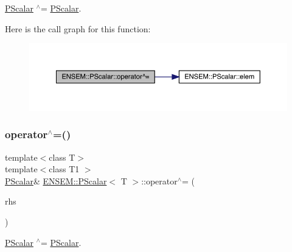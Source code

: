 \mbox{\hyperlink{classENSEM_1_1PScalar}{P\+Scalar}} $^\wedge$= \mbox{\hyperlink{classENSEM_1_1PScalar}{P\+Scalar}}. 

Here is the call graph for this function\+:
\nopagebreak
\begin{figure}[H]
\begin{center}
\leavevmode
\includegraphics[width=350pt]{d3/d27/classENSEM_1_1PScalar_a3f256371cc925f01209559addfcbb632_cgraph}
\end{center}
\end{figure}
\mbox{\label{classENSEM_1_1PScalar_a3f256371cc925f01209559addfcbb632}} 
\subsubsection{\texorpdfstring{operator$^\wedge$=()}{operator^=()}\hspace{0.1cm}{\footnotesize\ttfamily [2/2]}}
{\footnotesize\ttfamily template$<$class T$>$ \\
template$<$class T1 $>$ \\
\mbox{\hyperlink{classENSEM_1_1PScalar}{P\+Scalar}}\& \mbox{\hyperlink{classENSEM_1_1PScalar}{E\+N\+S\+E\+M\+::\+P\+Scalar}}$<$ T $>$\+::operator$^\wedge$= (\begin{DoxyParamCaption}\item[{const \mbox{\hyperlink{classENSEM_1_1PScalar}{P\+Scalar}}$<$ T1 $>$ \&}]{rhs }\end{DoxyParamCaption})\hspace{0.3cm}{\ttfamily [inline]}}



\mbox{\hyperlink{classENSEM_1_1PScalar}{P\+Scalar}} $^\wedge$= \mbox{\hyperlink{classENSEM_1_1PScalar}{P\+Scalar}}. 

